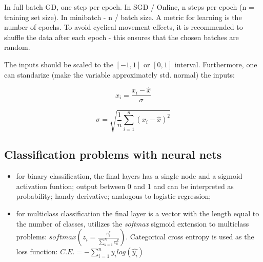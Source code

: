 \documentclass[11pt]{book}
\begin{document}
In full batch GD, one step per epoch. In SGD / Online, n steps per epoch (n = training set size). In minibatch - n / batch size. A metric for learning is the number of epochs. To avoid cyclical movement effects, it is recommended to shuffle the data after each epoch - this ensures that the chosen batches are random.  

The inputs should be scaled to the $[-1, 1]$ or $[0, 1]$ interval. Furthermore, one can standarize (make the variable approximately std. normal) the inputs:

\begin{equation}
x_{i} = \frac{x_i - \hat{x}}{\sigma}
\end{equation}

\begin{equation}
\sigma = \sqrt{ \frac{1}{n} \sum_{i=1}^{n} (x_i - \hat{x})^2}
\end{equation}



\subsection{Classification problems with neural nets}

\begin{itemize}
\item for binary classification, the final layers has a single node and a sigmoid activation funtion; output between 0 and 1 and can be interpreted as probability; handy derivative; analogous to logistic regression;
\item for multiclass classification the final layer is a vector with the length equal to the number of classes, utilizes the \textit{softmax} sigmoid extension to multiclass problems: $softmax(z_{i} = \frac{e^{z}_{i}}{\sum_{k=1}^{K} e^{Z}_k})$. Categorical cross entropy is used as the loss function: $C.E. = - \sum_{i=1}^{n} y_{i} log(\hat{y_{i}})$



\end{itemize}
\end{document}
